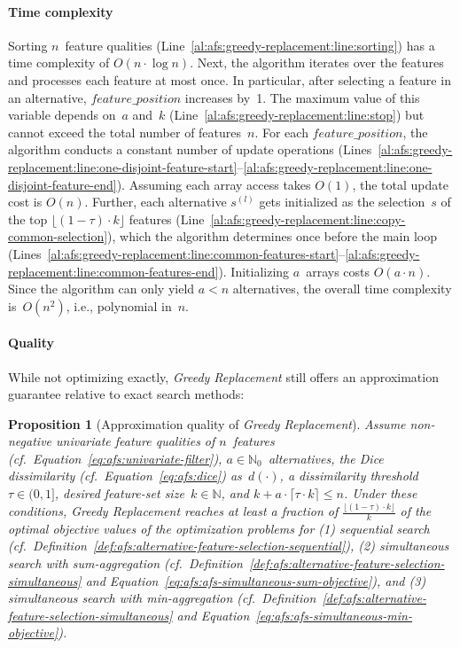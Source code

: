 \documentclass{article}
\newtheorem{proposition}{Proposition}
\theoremstyle{definition}
\begin{document}
\paragraph{Time complexity}

Sorting $n$~feature qualities (Line~\ref{al:afs:greedy-replacement:line:sorting}) has a time complexity of $O(n \cdot \log n)$.
Next, the algorithm iterates over the features and processes each feature at most once.
In particular, after selecting a feature in an alternative, $\mathit{feature\_position}$ increases by~1.
The maximum value of this variable depends on~$a$ and~$k$ (Line~\ref{al:afs:greedy-replacement:line:stop}) but cannot exceed the total number of features~$n$.
For each $\mathit{feature\_position}$, the algorithm conducts a constant number of update operations (Lines~\ref{al:afs:greedy-replacement:line:one-disjoint-feature-start}--\ref{al:afs:greedy-replacement:line:one-disjoint-feature-end}).
Assuming each array access takes $O(1)$, the total update cost is $O(n)$.
Further, each alternative $s^{(l)}$ gets initialized as the selection~$s$ of the top $\lfloor (1 - \tau) \cdot k \rfloor$ features (Line~\ref{al:afs:greedy-replacement:line:copy-common-selection}), which the algorithm determines once before the main loop (Lines~\ref{al:afs:greedy-replacement:line:common-features-start}--\ref{al:afs:greedy-replacement:line:common-features-end}).
Initializing $a$~arrays costs $O(a \cdot n)$.
Since the algorithm can only yield $a < n$ alternatives, the overall time complexity is~$O(n^2)$, i.e., polynomial in~$n$.

\paragraph{Quality}

While not optimizing exactly, \emph{Greedy Replacement} still offers an approximation guarantee relative to exact search methods:
%
\begin{proposition}[Approximation quality of \emph{Greedy Replacement}]
	Assume non-negative univariate feature qualities of $n$~features (cf.~Equation~\ref{eq:afs:univariate-filter}), $a \in \mathbb{N}_0$~alternatives, the Dice dissimilarity (cf.~Equation~\ref{eq:afs:dice}) as~$d(\cdot)$, a dissimilarity threshold~$\tau \in (0,1]$, desired feature-set size~$k \in \mathbb{N}$, and $k + a \cdot \lceil \tau \cdot k \rceil \leq n$.
	Under these conditions, \emph{Greedy Replacement} reaches at least a fraction of $\frac{\lfloor (1 - \tau) \cdot k \rfloor}{k}$ of the optimal objective values of the optimization problems for (1) sequential search (cf.~Definition~\ref{def:afs:alternative-feature-selection-sequential}), (2) simultaneous search with sum-aggregation (cf.~Definition~\ref{def:afs:alternative-feature-selection-simultaneous} and Equation~\ref{eq:afs:afs-simultaneous-sum-objective}), and (3) simultaneous search with min-aggregation (cf.~Definition~\ref{def:afs:alternative-feature-selection-simultaneous} and Equation~\ref{eq:afs:afs-simultaneous-min-objective}).
	\label{prop:afs:approximation-greedy-replacement}
\end{proposition}
\end{document}
